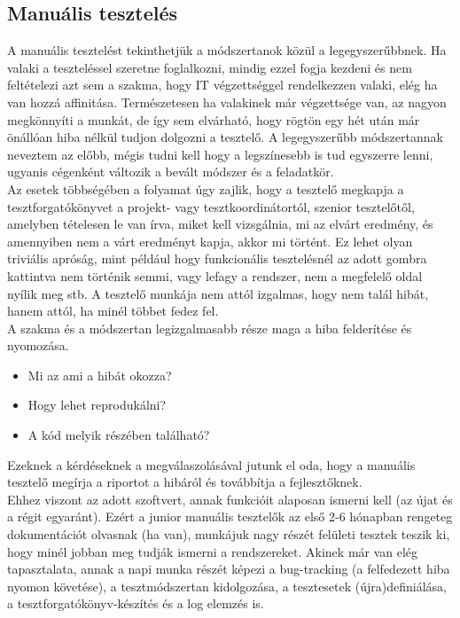 \subsection{Manuális tesztelés} A manuális tesztelést tekinthetjük a módszertanok közül a legegyszerűbbnek. Ha valaki a teszteléssel szeretne foglalkozni, mindig ezzel fogja kezdeni és nem feltételezi azt sem a szakma, hogy IT végzettséggel rendelkezzen valaki, elég ha van hozzá affinitása. Természetesen ha valakinek már végzettsége van, az nagyon megkönnyíti a munkát, de így sem elvárható, hogy rögtön egy hét után már önállóan hiba nélkül tudjon dolgozni a tesztelő. A legegyszerűbb módszertannak neveztem az előbb, mégis tudni kell hogy a legszínesebb is tud egyszerre lenni, ugyanis cégenként változik a bevált módszer és a feladatkör.\\
Az esetek többségében a folyamat úgy zajlik, hogy a tesztelő megkapja a tesztforgatókönyvet a projekt- vagy tesztkoordinátortól, szenior tesztelőtől, amelyben tételesen le van írva, miket kell vizsgálnia, mi az elvárt eredmény, és amennyiben nem a várt eredményt kapja, akkor mi történt. Ez lehet olyan triviális apróság, mint például hogy funkcionális tesztelésnél az adott gombra kattintva nem történik semmi, vagy lefagy a rendszer, nem a megfelelő oldal nyílik meg stb. A tesztelő munkája nem attól izgalmas, hogy nem talál hibát, hanem attól, ha minél többet fedez fel\cite{computerworld}.\\
A szakma és a módszertan legizgalmasabb része maga a hiba felderítése és nyomozása. 
\begin{itemize}
\item Mi az ami a hibát okozza?
\item Hogy lehet reprodukálni?
\item A kód melyik részében található?
\end{itemize}
Ezeknek a kérdéseknek a megválaszolásával jutunk el oda, hogy a manuális tesztelő megírja a riportot a hibáról és továbbítja a fejlesztőknek.\\
Ehhez viszont az adott szoftvert, annak funkcióit alaposan ismerni kell (az újat és a régit egyaránt). Ezért a junior manuális tesztelők az első 2-6 hónapban rengeteg dokumentációt olvasnak (ha van), munkájuk nagy részét felületi tesztek teszik ki, hogy minél jobban meg tudják ismerni a rendszereket. Akinek már van elég tapasztalata, annak a napi munka részét képezi a bug-tracking (a felfedezett hiba nyomon követése), a tesztmódszertan kidolgozása, a tesztesetek (újra)definiálása, a tesztforgatókönyv-készítés és a log elemzés is\cite{computerworld}.



